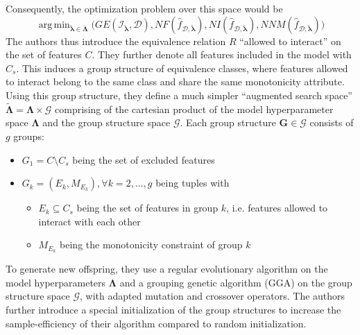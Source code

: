 \documentclass[twoside,11pt]{article}
\DeclareMathOperator*{\argmin}{arg\,min}
\begin{document}
Consequently, the optimization problem over this space would be
\begin{equation}
  \argmin_{\check{\boldsymbol\lambda}\in\check{\boldsymbol\Lambda}} \big(
    GE(\mathcal{I}_{\check{\boldsymbol\lambda}},\mathcal{D}),
    NF(\hat{f}_{\mathcal{D},\check{\boldsymbol\lambda}}),
    NI(\hat{f}_{\mathcal{D},\check{\boldsymbol\lambda}}),
    NNM(\hat{f}_{\mathcal{D},\check{\boldsymbol\lambda}})
  \big)
  \label{eq-eagga-extended-space}
\end{equation}
The authors thus introduce the equivalence relation $R$ ``allowed to interact'' on the set of features $C$. They further denote all features included in the model with $C_s$.
This induces a group structure of equivalence classes, where features allowed to interact belong to the same class and share the same monotonicity attribute.
Using this group structure, they define a much simpler ``augmented search space'' $\tilde{\boldsymbol\Lambda}=\boldsymbol\Lambda\times\mathcal{G}$ comprising of
the cartesian product of the model hyperparameter space $\boldsymbol\Lambda$ and the group structure space $\mathcal{G}$.
Each group structure $\boldsymbol{G}\in\mathcal{G}$ consists of $g$ groups:
\begin{itemize}
  \item $G_1=C\setminus C_s$ being the set of excluded features
  \item $G_k=(E_k,M_{E_k}), \forall k=2,...,g$ being tuples with
  \begin{itemize}
    \item $E_k\subseteq C_s$ being the set of features in group $k$, i.e. features allowed to interact with each other
    \item $M_{E_k}$ being the monotonicity constraint of group $k$
  \end{itemize}
\end{itemize}
To generate new offspring, they use a regular evolutionary algorithm on the model hyperparameters $\boldsymbol\Lambda$ and a grouping genetic algorithm (GGA) on
the group structure space $\mathcal{G}$, with adapted mutation and crossover operators.
The authors further introduce a special initialization of the group structures to increase the sample-efficiency of their algorithm compared to random initialization.
\citep[pp. 541-543]{EAGGA}
\end{document}
